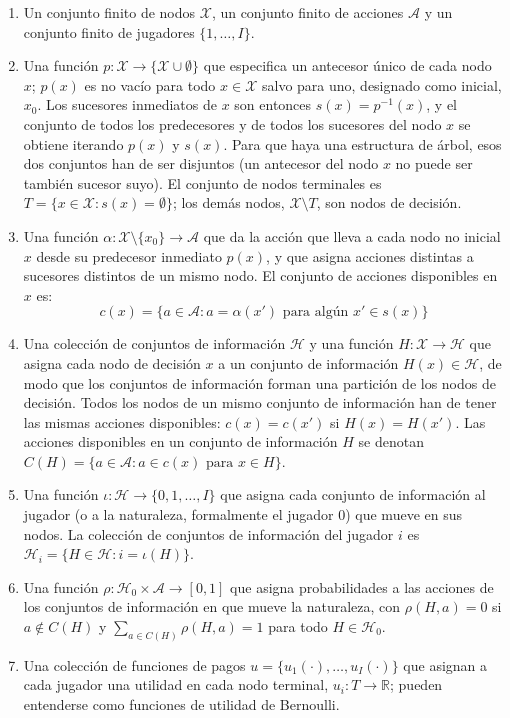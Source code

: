\documentclass[10pt,a4paper]{article}
\begin{document}
\begin{enumerate}
    \item[(i)] Un conjunto finito de nodos $\mathcal{X}$, un conjunto finito de acciones $\mathcal{A}$ y un conjunto finito de jugadores $\{1,\ldots,I\}$.
    \item[(ii)] Una función $p:\mathcal{X}\rightarrow\{\mathcal{X}\cup\emptyset\}$ que especifica un antecesor único de cada nodo $x$; $p(x)$ es no vacío para todo $x\in\mathcal{X}$ salvo para uno, designado como inicial, $x_0$. Los sucesores inmediatos de $x$ son entonces $s(x)=p^{-1}(x)$, y el conjunto de todos los predecesores y de todos los sucesores del nodo $x$ se obtiene iterando $p(x)$ y $s(x)$. Para que haya una estructura de árbol, esos dos conjuntos han de ser disjuntos (un antecesor del nodo $x$ no puede ser también sucesor suyo). El conjunto de nodos terminales es $T=\{x\in\mathcal{X}: s(x)=\emptyset\}$; los demás nodos, $\mathcal{X}\setminus T$, son nodos de decisión.
    \item[(iii)] Una función $\alpha:\mathcal{X}\setminus\{x_0\}\rightarrow\mathcal{A}$ que da la acción que lleva a cada nodo no inicial $x$ desde su predecesor inmediato $p(x)$, y que asigna acciones distintas a sucesores distintos de un mismo nodo. El conjunto de acciones disponibles en $x$ es:
    $$c(x)=\{a\in\mathcal{A}: a=\alpha(x') \text{ para algún } x'\in s(x)\}$$
    \item[(iv)] Una colección de conjuntos de información $\mathcal{H}$ y una función $H:\mathcal{X}\rightarrow\mathcal{H}$ que asigna cada nodo de decisión $x$ a un conjunto de información $H(x)\in\mathcal{H}$, de modo que los conjuntos de información forman una partición de los nodos de decisión. Todos los nodos de un mismo conjunto de información han de tener las mismas acciones disponibles: $c(x)=c(x')$ si $H(x)=H(x')$. Las acciones disponibles en un conjunto de información $H$ se denotan $C(H)=\{a\in\mathcal{A}: a\in c(x) \text{ para } x\in H\}$.
    \item[(v)] Una función $\iota:\mathcal{H}\rightarrow\{0,1,\ldots,I\}$ que asigna cada conjunto de información al jugador (o a la naturaleza, formalmente el jugador $0$) que mueve en sus nodos. La colección de conjuntos de información del jugador $i$ es $\mathcal{H}_i=\{H\in\mathcal{H}: i=\iota(H)\}$.
    \item[(vi)] Una función $\rho:\mathcal{H}_0\times\mathcal{A}\rightarrow[0,1]$ que asigna probabilidades a las acciones de los conjuntos de información en que mueve la naturaleza, con $\rho(H,a)=0$ si $a\notin C(H)$ y $\sum_{a\in C(H)}\rho(H,a)=1$ para todo $H\in\mathcal{H}_0$.
    \item[(vii)] Una colección de funciones de pagos $u=\{u_1(\cdot),\ldots,u_I(\cdot)\}$ que asignan a cada jugador una utilidad en cada nodo terminal, $u_i:T\rightarrow\mathbb{R}$; pueden entenderse como funciones de utilidad de Bernoulli.
\end{enumerate}
\end{document}
